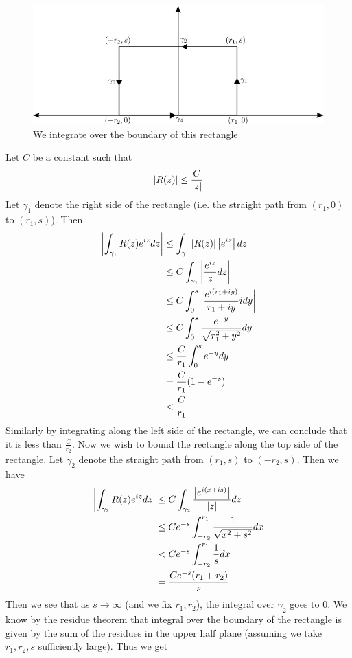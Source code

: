 \begin{figure}[h]
    \centering
    \includegraphics{Images/rational_exp_contour.png}
    \caption{We integrate over the boundary of this rectangle}
    \label{fig:rational-exp-contour}
\end{figure}

Let $C$ be a constant such that
$$ \left|R(z)\right| \leq \frac{C}{\left|z\right|} $$
Let $\gamma_1$ denote the right side of the rectangle (i.e. the straight path from $(r_1, 0)$ to $(r_1, s)$). Then
\begin{align*}
   \left|\int_{\gamma_1} R(z) e^{iz} dz\right| &\leq \int_{\gamma_1} \left|R(z)\right| \left|e^{iz}\right| dz\\
   &\leq C \int_{\gamma_1} \left| \frac{e^{iz}}{z} dz \right|\\
   &\leq C \int_{0}^s \left|\frac{e^{i(r_1 + iy)}}{r_1 + iy} idy\right|\\
   &\leq C \int_{0}^s \frac{e^{-y}}{\sqrt{r_1^2 + y^2}} dy\\
   &\leq \frac{C}{r_1} \int_0^s e^{-y} dy\\
   &= \frac{C}{r_1}(1 - e^{-s})\\
   &< \frac{C}{r_1}
 \end{align*}
Similarly by integrating along the left side of the rectangle, we can conclude that it is less than $\frac{C}{r_2}$. Now we wish to bound the rectangle along the top side of the rectangle. Let $\gamma_2$ denote the straight path from $(r_1, s)$ to $(-r_2, s)$. Then we have 
\begin{align*}
    \left|\int_{\gamma_2} R(z) e^{iz} dz\right| &\leq C \int_{\gamma_2} \frac{\left|e^{i(x + is)}\right|}{\left|z\right|} dz\\
    &\leq Ce^{-s} \int_{-r_2}^{r_1} \frac{1}{\sqrt{x^2 + s^2}} dx\\
    &< Ce^{-s} \int_{-r_2}^{r_1}\frac{1}{s} dx\\
    &= \frac{Ce^{-s}(r_1 + r_2)}{s}
 \end{align*}
 Then we see that as $s \to \infty$ (and we fix $r_1, r_2$), the integral over $\gamma_2$ goes to 0. We know by the residue theorem that integral over the boundary of the rectangle is given by the sum of the residues in the upper half plane (assuming we take $r_1, r_2, s$ sufficiently large). Thus we get
